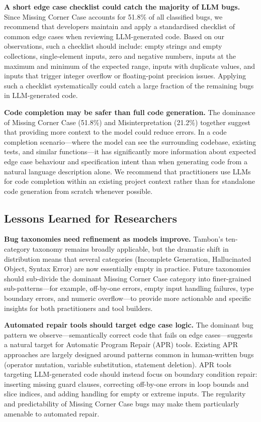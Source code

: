 \documentclass[smallextended]{svjour3}
\begin{document}
\textbf{A short edge case checklist could catch the majority of LLM bugs.} Since Missing Corner Case accounts for 51.8\% of all classified bugs, we recommend that developers maintain and apply a standardised checklist of common edge cases when reviewing LLM-generated code. Based on our observations, such a checklist should include: empty strings and empty collections, single-element inputs, zero and negative numbers, inputs at the maximum and minimum of the expected range, inputs with duplicate values, and inputs that trigger integer overflow or floating-point precision issues. Applying such a checklist systematically could catch a large fraction of the remaining bugs in LLM-generated code.

\textbf{Code completion may be safer than full code generation.} The dominance of Missing Corner Case (51.8\%) and Misinterpretation (21.2\%) together suggest that providing more context to the model could reduce errors. In a code completion scenario---where the model can see the surrounding codebase, existing tests, and similar functions---it has significantly more information about expected edge case behaviour and specification intent than when generating code from a natural language description alone. We recommend that practitioners use LLMs for code completion within an existing project context rather than for standalone code generation from scratch whenever possible.

\subsection{Lessons Learned for Researchers}

\textbf{Bug taxonomies need refinement as models improve.} Tambon's ten-category taxonomy remains broadly applicable, but the dramatic shift in distribution means that several categories (Incomplete Generation, Hallucinated Object, Syntax Error) are now essentially empty in practice. Future taxonomies should sub-divide the dominant Missing Corner Case category into finer-grained sub-patterns---for example, off-by-one errors, empty input handling failures, type boundary errors, and numeric overflow---to provide more actionable and specific insights for both practitioners and tool builders.

\textbf{Automated repair tools should target edge case logic.} The dominant bug pattern we observe---semantically correct code that fails on edge cases---suggests a natural target for Automatic Program Repair (APR) tools. Existing APR approaches are largely designed around patterns common in human-written bugs (operator mutation, variable substitution, statement deletion). APR tools targeting LLM-generated code should instead focus on boundary condition repair: inserting missing guard clauses, correcting off-by-one errors in loop bounds and slice indices, and adding handling for empty or extreme inputs. The regularity and predictability of Missing Corner Case bugs may make them particularly amenable to automated repair.
\end{document}
